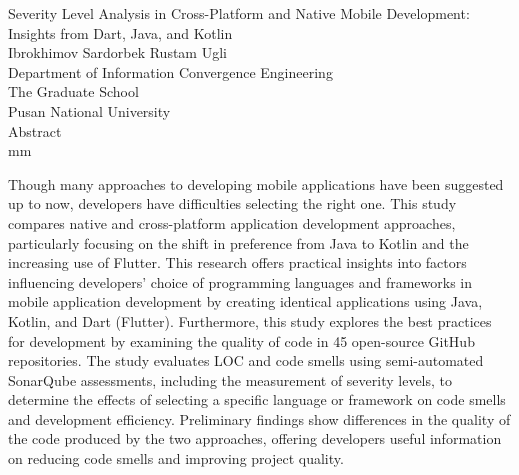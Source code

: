 \thispagestyle{empty}
\begin{center}
    \vskip 3.5cm
    {\Large{Severity Level Analysis in Cross-Platform and Native Mobile Development: Insights from Dart, Java, and Kotlin}} \\
    \vskip 15mm
    {\large{Ibrokhimov Sardorbek Rustam Ugli}} \\
    \vskip 10mm
    {Department of Information Convergence Engineering} \\
    {The Graduate School} \\
    {Pusan National University} \\
    \vskip 15mm
    {\large{Abstract}}\\
     mm
\end{center}
Though many approaches to developing mobile applications have been suggested up to now, developers have difficulties selecting the right one. This study compares native and cross-platform application development approaches, particularly focusing on the shift in preference from Java to Kotlin and the increasing use of Flutter. This research offers practical insights into factors influencing developers’ choice of programming languages and frameworks in mobile application development by creating identical applications using Java, Kotlin, and Dart (Flutter). Furthermore, this study explores the best practices for development by examining the quality of code in 45 open-source GitHub repositories. The study evaluates LOC and code smells using semi-automated SonarQube assessments, including the measurement of severity levels, to determine the effects of selecting a specific language or framework on code smells and development efficiency. Preliminary findings show differences in the quality of the code produced by the two approaches, offering developers useful information on reducing code smells and improving project quality.